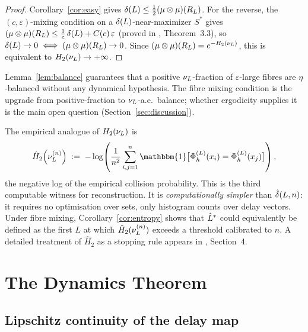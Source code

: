 \begin{proof}
Corollary~\ref{cor:easy} gives $\delta(L) \leq \tfrac{1}{2}(\mu\otimes\mu)(R_L)$.
For the reverse, the $(c,\varepsilon)$-mixing condition on a $\delta(L)$-near-maximizer
$S^*$ gives $(\mu\otimes\mu)(R_L) \leq \frac{1}{c}\,\delta(L) + C(c)\,\varepsilon$
(proved in \cite{mahon_bridge}, Theorem~3.3), so $\delta(L) \to 0 \iff
(\mu\otimes\mu)(R_L) \to 0$.
Since $(\mu\otimes\mu)(R_L) = e^{-H_2(\nu_L)}$, this is equivalent to
$H_2(\nu_L) \to +\infty$.
\end{proof}

\begin{remark}
\label{rem:balance-mechanism}
Lemma~\ref{lem:balance} guarantees that a positive $\nu_L$-fraction of
$\varepsilon$-large fibres are $\eta$-balanced without any dynamical hypothesis.
The fibre mixing condition is the upgrade from positive-fraction to
$\nu_L$-a.e.\ balance; whether ergodicity supplies it is the main open
question (Section~\ref{sec:discussion}).
\end{remark}

\begin{remark}
\label{rem:entropy-witness}
The empirical analogue of $H_2(\nu_L)$ is
\[
  \hat{H}_2\!\left(\nuL^{(n)}\right)
  \;:=\;
  -\log\!\left(\frac{1}{n^2}\sum_{i,j=1}^n
    \mathbbm{1}\bigl[\PhiL(x_i) = \PhiL(x_j)\bigr]\right),
\]
the negative log of the empirical collision probability.
This is the third computable witness for reconstruction.
It is \emph{computationally simpler} than $\hat{\delta}(L,n)$: it requires no
optimisation over sets, only histogram counts over delay vectors.
Under fibre mixing, Corollary~\ref{cor:entropy} shows that $\hat{L}^*$ could
equivalently be defined as the first $L$ at which $\hat{H}_2(\nu_L^{(n)})$
exceeds a threshold calibrated to $n$.
A detailed treatment of $\hat{H}_2$ as a stopping rule appears in
\cite{mahon_bridge}, Section~4.
\end{remark}

\section{The Dynamics Theorem}
\label{sec:dynamics}

\subsection{Lipschitz continuity of the delay map}

